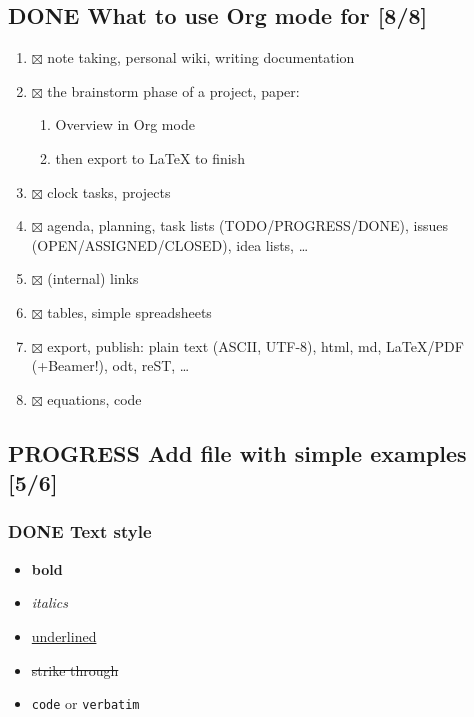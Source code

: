 \documentclass[11pt]{article}
\begin{document}
\subsection{{\bfseries\sffamily DONE} What to use Org mode for [8/8]}
\label{sec:orga78f003}
\begin{enumerate}
\item{$\boxtimes$} note taking, personal wiki, writing documentation
\item{$\boxtimes$} the brainstorm phase of a project, paper:
\begin{enumerate}
\item Overview in Org mode
\item then export to \LaTeX{} to finish
\end{enumerate}
\item{$\boxtimes$} clock tasks, projects
\item{$\boxtimes$} agenda, planning, task lists (TODO/PROGRESS/DONE), issues (OPEN/ASSIGNED/CLOSED), idea lists, \ldots{}
\item{$\boxtimes$} (internal) links
\item{$\boxtimes$} tables, simple spreadsheets
\item{$\boxtimes$} export, publish: plain text (ASCII, UTF-8), html, md, \LaTeX{}/PDF (+Beamer!), odt, reST, \ldots{}
\item{$\boxtimes$} equations, code
\end{enumerate}

\subsection{{\bfseries\sffamily PROGRESS} Add file with simple examples [5/6]}
\label{sec:orgf01a5a2}
\subsubsection{{\bfseries\sffamily DONE} Text style}
\label{sec:orga18de45}
\begin{itemize}
\item \textbf{bold}
\item \emph{italics}
\item \uline{underlined}
\item \sout{strike through}
\item \texttt{code} or \texttt{verbatim}
\end{itemize}
\end{document}
